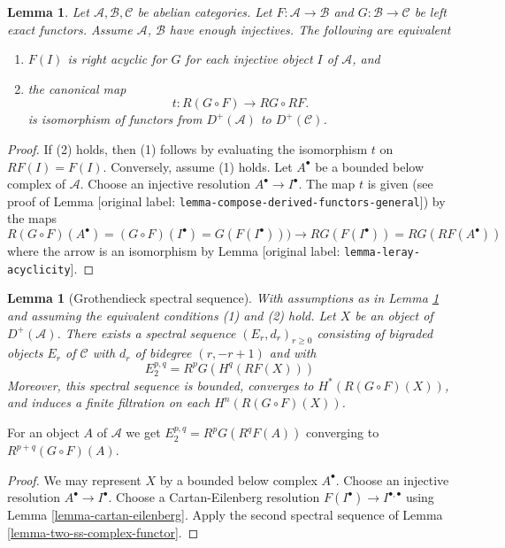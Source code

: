 \documentclass[10pt,a4paper]{article}
\theoremstyle{plain}
\newtheorem{lemma}[subsection]{Lemma}
\theoremstyle{definition}
\theoremstyle{remark}
\numberwithin{equation}{subsection}
\begin{document}
\begin{lemma}
\label{lemma-compose-derived-functors}
Let $\mathcal{A}, \mathcal{B}, \mathcal{C}$ be abelian categories.
Let $F : \mathcal{A} \to \mathcal{B}$ and $G : \mathcal{B} \to \mathcal{C}$
be left exact functors. Assume $\mathcal{A}$, $\mathcal{B}$ have
enough injectives. The following are equivalent
\begin{enumerate}
\item $F(I)$ is right acyclic for $G$ for each injective object $I$
of $\mathcal{A}$, and
\item the canonical map
$$
t : R(G \circ F) \longrightarrow RG \circ RF.
$$
is isomorphism of functors from $D^{+}(\mathcal{A})$ to $D^{+}(\mathcal{C})$.
\end{enumerate}
\end{lemma}

\begin{proof}
If (2) holds, then (1) follows by evaluating the isomorphism
$t$ on $RF(I) = F(I)$. Conversely, assume (1) holds.
Let $A^\bullet$ be a bounded below complex of $\mathcal{A}$.
Choose an injective resolution $A^\bullet \to I^\bullet$.
The map $t$ is given (see proof of
Lemma [original label: \nolinkurl{lemma-compose-derived-functors-general}])
by the maps
$$
R(G \circ F)(A^\bullet) =
(G \circ F)(I^\bullet) =
G(F(I^\bullet))) \to
RG(F(I^\bullet)) =
RG(RF(A^\bullet))
$$
where the arrow is an isomorphism by
Lemma [original label: \nolinkurl{lemma-leray-acyclicity}].
\end{proof}


\begin{lemma}[Grothendieck spectral sequence]
\label{lemma-grothendieck-spectral-sequence}
With assumptions as in Lemma \ref{lemma-compose-derived-functors}
and assuming the equivalent conditions (1) and (2) hold.
Let $X$ be an object of $D^{+}(\mathcal{A})$.
There exists a spectral sequence $(E_r, d_r)_{r \geq 0}$
consisting of bigraded objects $E_r$ of $\mathcal{C}$ with
$d_r$ of bidegree $(r, - r + 1)$ and with
$$
E_2^{p, q} = R^pG(H^q(RF(X)))
$$
Moreover, this spectral sequence is bounded, converges to
$H^*(R(G \circ F)(X))$, and induces a finite filtration
on each $H^n(R(G \circ F)(X))$.
\end{lemma}


\noindent
For an object $A$ of $\mathcal{A}$ we get
$E_2^{p, q} = R^pG(R^qF(A))$ converging to $R^{p + q}(G \circ F)(A)$.


\begin{proof}
We may represent $X$ by a bounded below complex $A^\bullet$.
Choose an injective resolution $A^\bullet \to I^\bullet$.
Choose a Cartan-Eilenberg resolution
$F(I^\bullet) \to I^{\bullet, \bullet}$ using
Lemma \ref{lemma-cartan-eilenberg}.
Apply the second spectral sequence of
Lemma \ref{lemma-two-ss-complex-functor}.
\end{proof}










\end{document}
